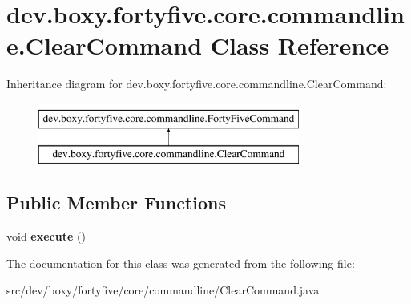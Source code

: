 \hypertarget{classdev_1_1boxy_1_1fortyfive_1_1core_1_1commandline_1_1_clear_command}{
\section{dev.boxy.fortyfive.core.commandline.ClearCommand Class Reference}
\label{de/d64/classdev_1_1boxy_1_1fortyfive_1_1core_1_1commandline_1_1_clear_command}
}
Inheritance diagram for dev.boxy.fortyfive.core.commandline.ClearCommand:\begin{figure}[H]
\begin{center}
\leavevmode
\includegraphics[height=2.000000cm]{de/d64/classdev_1_1boxy_1_1fortyfive_1_1core_1_1commandline_1_1_clear_command}
\end{center}
\end{figure}
\subsection*{Public Member Functions}
\begin{DoxyCompactItemize}
\item 
\hypertarget{classdev_1_1boxy_1_1fortyfive_1_1core_1_1commandline_1_1_clear_command_a976d3d4c237ca9f3a88383c9226d470f}{
void {\bfseries execute} ()}
\label{de/d64/classdev_1_1boxy_1_1fortyfive_1_1core_1_1commandline_1_1_clear_command_a976d3d4c237ca9f3a88383c9226d470f}

\end{DoxyCompactItemize}


The documentation for this class was generated from the following file:\begin{DoxyCompactItemize}
\item 
src/dev/boxy/fortyfive/core/commandline/ClearCommand.java\end{DoxyCompactItemize}
